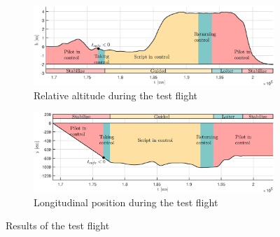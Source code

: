 
\begin{figure}[htbp]
	\centering
	\begin{subfigure}{\textwidth}
		\includegraphics[width=\textwidth]{./figures/h_flight.eps}
		\caption{Relative altitude during the test flight}
		\label{fig:h_flight}
	\end{subfigure}
	\begin{subfigure}{\textwidth}
		\includegraphics[width=\textwidth]{./figures/y_flight.eps}
		\caption{Longitudinal position during the test flight}
		\label{fig:y_flight}
	\end{subfigure}
	\caption{Results of the test flight}
	\label{fig:flight}
\end{figure}
